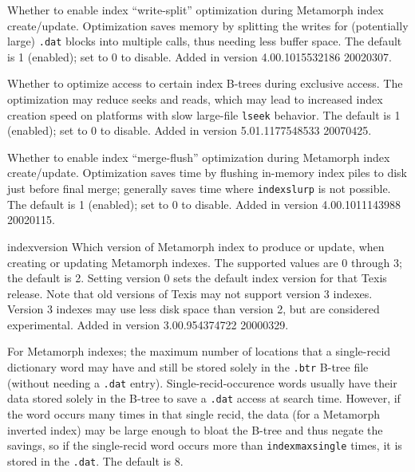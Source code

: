 \begin{description}
\item[indexwritesplit] Whether to enable index ``write-split''
optimization during Metamorph index create/update.  Optimization saves
memory by splitting the writes for (potentially large) \verb`.dat`
blocks into multiple calls, thus needing less buffer space.  The
default is 1 (enabled); set to 0 to disable.  Added in version
4.00.1015532186 20020307.

\item[indexbtreeexclusive] Whether to optimize access to certain
index B-trees during exclusive access.  The optimization may reduce
seeks and reads, which may lead to increased index creation speed on
platforms with slow large-file \verb`lseek` behavior.  The default is
1 (enabled); set to 0 to disable.  Added in version 5.01.1177548533
20070425.

\item[mergeflush] Whether to enable index ``merge-flush'' optimization
during Metamorph index create/update.  Optimization saves time by
flushing in-memory index piles to disk just before final merge;
generally saves time where \verb`indexslurp` is not possible.  The
default is 1 (enabled); set to 0 to disable.  Added in version
4.00.1011143988 20020115.

\item[indexversion]
\item{indexversion}
Which version of Metamorph index to produce or
update, when creating or updating Metamorph indexes.  The supported
values are 0 through 3; the default is 2.  Setting version 0 sets the
default index version for that Texis release.  Note that old versions
of Texis may not support version 3 indexes.  Version 3 indexes may use
less disk space than version 2, but are considered experimental.
Added in version 3.00.954374722 20000329.

\item[indexmaxsingle]
\label{indexmaxsingle}
For Metamorph indexes; the maximum number of
locations that a single-recid dictionary word may have and still be
stored solely in the \verb`.btr` B-tree file (without needing a
\verb`.dat` entry).  Single-recid-occurence words usually have their
data stored solely in the B-tree to save a \verb`.dat` access at
search time.  However, if the word occurs many times in that single
recid, the data (for a Metamorph inverted index) may be large enough
to bloat the B-tree and thus negate the savings, so if the
single-recid word occurs more than \verb`indexmaxsingle` times, it is
stored in the \verb`.dat`.  The default is 8.


\end{description}
